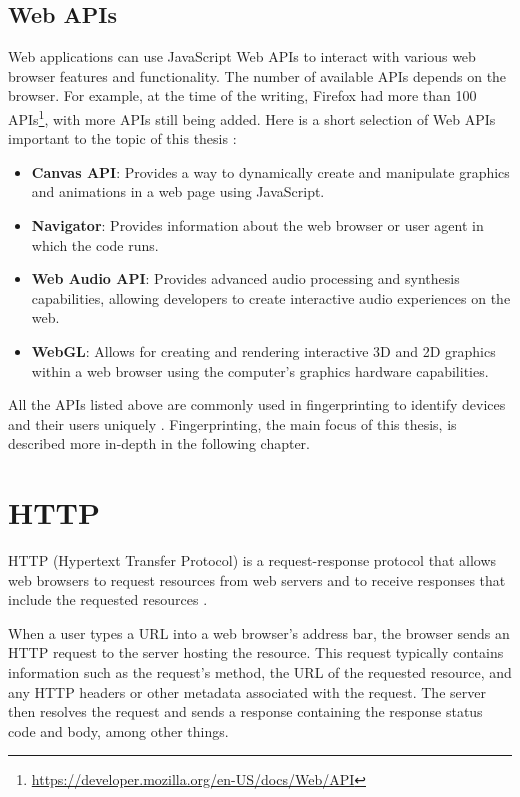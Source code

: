 \subsection{Web APIs}

Web applications can use JavaScript Web APIs to interact with various web browser features and functionality. The number of available APIs depends on the browser. For example, at the time of the writing, Firefox had more than 100 APIs\footnote{\url{https://developer.mozilla.org/en-US/docs/Web/API}}, with more APIs still being added. Here is a short selection of Web APIs important to the topic of this thesis \cite{SecurityWebDevs, SchauerDP}:

\begin{itemize}
	\item \textbf{Canvas API}: Provides a way to dynamically create and manipulate graphics and animations in a web page using JavaScript.
	\item \textbf{Navigator}: Provides information about the web browser or user agent in which the code runs.
	\item \textbf{Web Audio API}: Provides advanced audio processing and synthesis capabilities, allowing developers to create interactive audio experiences on the web.
	\item \textbf{WebGL}: Allows for creating and rendering interactive 3D and 2D graphics within a web browser using the computer's graphics hardware capabilities.
\end{itemize}

All the APIs listed above are commonly used in fingerprinting to identify devices and their users uniquely \cite{FingerprintingSurvey}. Fingerprinting, the main focus of this thesis, is described more in-depth in the following chapter.

\section{HTTP}

HTTP (Hypertext Transfer Protocol) is a request-response protocol that allows web browsers to request resources from web servers and to receive responses that include the requested resources \cite{MasteringNodeJS}.

When a user types a URL into a web browser's address bar, the browser sends an HTTP request to the server hosting the resource. This request typically contains information such as the request's method, the URL of the requested resource, and any HTTP headers or other metadata associated with the request. The server then resolves the request and sends a response containing the response status code and body, among other things.

